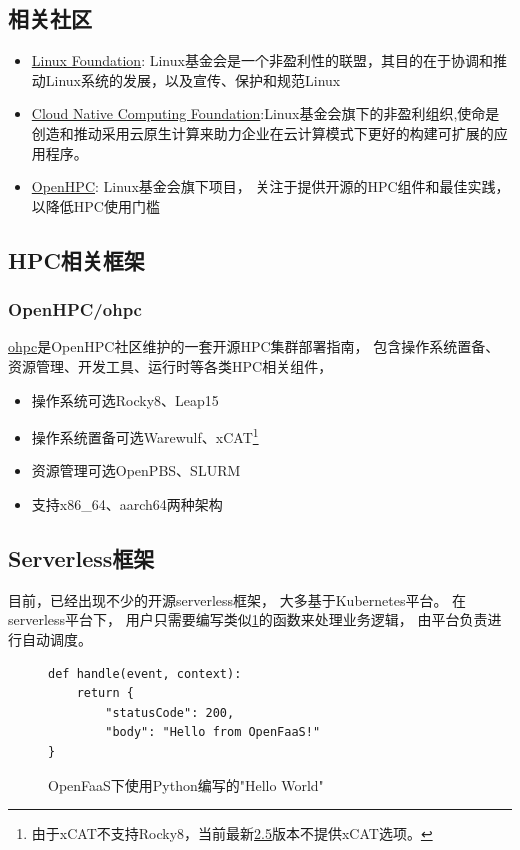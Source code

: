 \subsection{相关社区}
\begin{itemize}
    \item \href{https://www.linuxfoundation.org/}{Linux Foundation}: Linux基金会是一个非盈利性的联盟，其目的在于协调和推动Linux系统的发展，以及宣传、保护和规范Linux
    \item \href{https://www.cncf.io/}{Cloud Native Computing Foundation}:Linux基金会旗下的非盈利组织,使命是创造和推动采用云原生计算来助力企业在云计算模式下更好的构建可扩展的应用程序。
    \item \href{https://openhpc.community}{OpenHPC}: Linux基金会旗下项目，
    关注于提供开源的HPC组件和最佳实践，以降低HPC使用门槛
\end{itemize}

\subsection{HPC相关框架}
\subsubsection{OpenHPC/ohpc}
\href{https://github.com/openhpc/ohpc}{ohpc}是OpenHPC社区维护的一套开源HPC集群部署指南，
包含操作系统置备、资源管理、开发工具、运行时等各类HPC相关组件，

\begin{itemize}
    \item 操作系统可选Rocky8、Leap15
    \item 操作系统置备可选Warewulf、xCAT\footnote{由于xCAT不支持Rocky8，当前最新\href{https://github.com/openhpc/ohpc/releases/tag/v2.5.GA}{2.5}版本不提供xCAT选项。}
    \item 资源管理可选OpenPBS、SLURM
    \item 支持x86\_64、aarch64两种架构
\end{itemize}

\subsection{Serverless框架}
目前，已经出现不少的开源serverless框架，
大多基于Kubernetes平台。
在serverless平台下，
用户只需要编写类似\cref{openfaas_helloworld}的函数来处理业务逻辑，
由平台负责进行自动调度。
\begin{figure}
\begin{verbatim}
def handle(event, context):
    return {
        "statusCode": 200,
        "body": "Hello from OpenFaaS!"
}
\end{verbatim}
\caption{OpenFaaS下使用Python编写的"Hello World"}
\label{openfaas_helloworld}
\end{figure}

